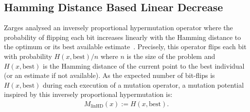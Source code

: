 \documentclass[lettersize,journal]{IEEEtran}
\begin{document}
 
 
 
 \subsection*{Hamming Distance Based Linear Decrease}
 Zarges analysed an inversely proportional hypermutation operator where the probability of flipping each bit increases linearly with the Hamming distance to the optimum %
 or its best available estimate~\cite{Zarges2008}.
 Precisely, this %
 operator flips each bit with probability $H(x,\text{best})/n$ where $n$ is the size of the problem and $H(x,\text{best})$ is the Hamming distance of the current point to the best individual (or an estimate if not available). As the expected number of bit-flips is $H(x, \text{best})$ during each execution of a mutation operator, a mutation potential inspired by this inversely proportional hypermutation is:
 \begin{align*}%
 M_{\text{linHD}}(x):=H(x,\text{best}).
 \end{align*}
 
\end{document}

